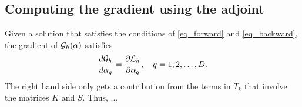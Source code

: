 \documentclass[11pt]{article}
\begin{document}
\subsection{Computing the gradient using the adjoint}

Given a solution that satisfies the conditions of \eqref{eq_forward} and \eqref{eq_backward}, the
gradient of ${\cal G}_h(\alpha)$ satisfies
\[
\frac{d{\cal G}_h}{d\alpha_q} = \frac{\partial{\cal L}_h}{\partial \alpha_q},\quad q=1,2,\ldots,D.
\]
The right hand side only gets a contribution from the terms in $T_k$ that involve the matrices $K$
and $S$. Thus, ...





\end{document}
